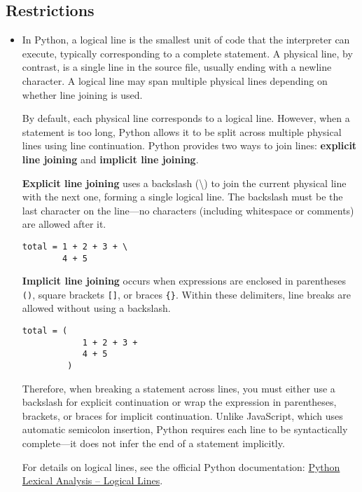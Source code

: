 \subsection*{Restrictions}

\begin{itemize}
\item In Python, a logical line is the smallest unit of code that the 
interpreter can execute, typically corresponding to a complete statement. 
A physical line, by contrast, is a single line in the source file, 
usually ending with a newline character. A logical line may span multiple 
physical lines depending on whether line joining is used.

By default, each physical line corresponds to a logical line. However, 
when a statement is too long, Python allows it to be split across multiple 
physical lines using line continuation. Python provides two ways to join 
lines: \textbf{explicit line joining} and \textbf{implicit line joining}.

\textbf{Explicit line joining} uses a backslash (\textbackslash) to join 
the current physical line with the next one, forming a single logical line. 
The backslash must be the last character on the line—no characters 
(including whitespace or comments) are allowed after it.

\begin{lstlisting}
total = 1 + 2 + 3 + \
        4 + 5
\end{lstlisting}

\textbf{Implicit line joining} occurs when expressions are enclosed in 
parentheses \texttt{()}, square brackets \texttt{[]}, or braces \texttt{\{\}}. 
Within these delimiters, line breaks are allowed without using a backslash.

\begin{lstlisting}
total = (
            1 + 2 + 3 +
            4 + 5
         )
\end{lstlisting}

Therefore, when breaking a statement across lines, you must either use a backslash for explicit continuation or wrap the expression in parentheses, brackets, or braces for implicit continuation. Unlike JavaScript, which uses automatic semicolon insertion, Python requires each line to be syntactically complete—it does not infer the end of a statement implicitly.

For details on logical lines, see the official Python documentation:
\href{https://docs.python.org/3/reference/lexical_analysis.html#logical-lines}{Python Lexical Analysis – Logical Lines}.



\end{itemize}
